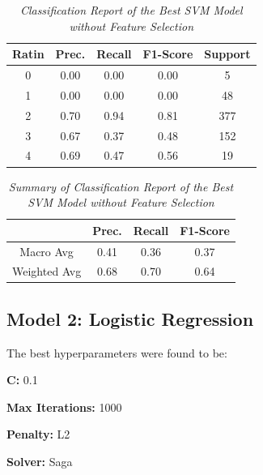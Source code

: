\documentclass[11pt]{article}
\begin{document}
\begin{table}[!ht]
    \begin{center}
        \begin{tabular}{c|c|c|c|c}			
            \hline
            Ratin & Prec. & Recall & F1-Score & Support \\
            \hline\hline
            0 & 0.00 & 0.00 & 0.00 & 5 \\
            1 & 0.00 & 0.00 & 0.00 & 48 \\
            2 & 0.70 & 0.94 & 0.81 & 377 \\
            3 & 0.67 & 0.37 & 0.48 & 152 \\
            4 & 0.69 & 0.47 & 0.56 & 19\\
                \hline
        \end{tabular}

        \caption{\textit{Classification Report of the Best SVM Model without Feature Selection}}
        \label{svm-ft-report}

    \end{center}
\end{table}
\begin{table}[!ht]
    \begin{center}
        \begin{tabular}{c||c|c|c}			
            \hline
             & Prec. & Recall & F1-Score \\
            \hline\hline
            Macro Avg & 0.41 & 0.36 & 0.37 \\
            Weighted Avg & 0.68 & 0.70 & 0.64 \\
                \hline
        \end{tabular}

        \caption{\textit{Summary of Classification Report of the Best SVM Model without Feature Selection}}
        \label{svm-ft-report-sum}

    \end{center}
\end{table}

\subsection{Model 2: Logistic Regression}
The best hyperparameters were found to be:

\textbf{C: } 0.1

\textbf{Max Iterations: } 1000

\textbf{Penalty: } L2

\textbf{Solver: } Saga
\end{document}
